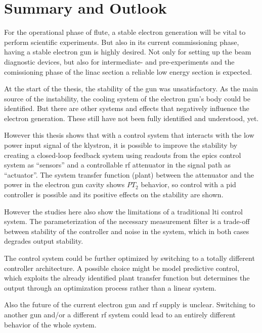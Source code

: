 \chapter{Summary and Outlook}
For the operational phase of \gls{flute}, a stable electron generation will be vital to perform scientific experiments. But also in its current commissioning phase, having a stable electron gun is highly desired. Not only for setting up the beam diagnostic devices, but also for intermediate- and pre-experiments and the comissioning phase of the \gls{linac} section a reliable low energy section is expected.

At the start of the thesis, the stability of the gun was unsatisfactory. As the main source of the instability, the cooling system of the electron gun's body could be identified. But there are other systems and effects that negatively influence the electron generation. These still have not been fully identified and understood, yet.

However this thesis shows that with a control system that interacts with the low power input signal of the klystron, it is possible to improve the stability by creating a closed-loop feedback system using readouts from the \gls{epics} control system as ``sensors'' and a controllable \gls{rf} attenuator in the signal path as ``actuator''. The system transfer function (plant) between the attenuator and the power in the electron gun cavity shows $PT_2$ behavior, so control with a \gls{pid} controller is possible and its positive effects on the stability are shown.

However the studies here also show the limitations of a traditional \gls{lti} control system. The parameterization of the necessary measurement filter is a trade-off between stability of the controller and noise in the system, which in both cases degrades output stability.

The control system could be further optimized by switching to a totally different controller architecture. A possible choice might be model predictive control, which exploits the already identified plant transfer function but determines the output through an optimization process rather than a linear system.

Also the future of the current electron gun and \gls{rf} supply is unclear. Switching to another gun and/or a different \gls{rf} system could lead to an entirely different behavior of the whole system.